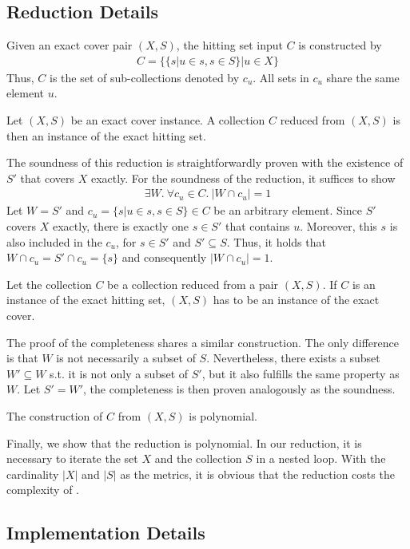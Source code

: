 \subsection{Reduction Details}
Given an exact cover pair $(X, S)$, the hitting set input $C$ is constructed by 
\begin{align*}
    C = \{\{s | u \in s, s \in S \} | u \in X\}
\end{align*}
Thus, $C$ is the set of sub-collections denoted by $c_u$. All sets in $c_u$ share the same element $u$.
\begin{lemma}[Soundess]
    Let $(X, S)$ be an exact cover instance. A collection $C$ reduced from $(X, S)$ is then an instance of the exact hitting set.
\end{lemma}
The soundness of this reduction is straightforwardly proven with the existence of $S'$ that covers $X$ exactly.
For the soundness of the reduction, it suffices to show 
\begin{align*}
    \exists W.\ \forall c_u \in C.\ |W \cap c_u| = 1
\end{align*}
Let $W = S'$ and $c_u = \{s | u \in s, s \in S \} \in C$ be an arbitrary element. 
Since $S'$ covers $X$ exactly, there is exactly one $s \in S'$ that contains $u$. Moreover, this $s$
is also included in the $c_u$, for $s \in S'$ and $S' \subseteq S$. Thus, it holds that $W \cap c_u = S' \cap c_u = \{s\}$ and consequently $|W \cap c_u| = 1$.
\begin{lemma}[Completeness]
    Let the collection $C$ be a collection reduced from a pair $(X, S)$. If $C$ is an instance of the exact hitting set, 
    $(X, S)$ has to be an instance of the exact cover.
\end{lemma}
The proof of the completeness shares a similar construction. The only difference is that $W$ is not 
necessarily a subset of $S$. Nevertheless, there exists a subset $W' \subseteq W$ s.t. it is not only a subset of $S'$, but it
also fulfills the same property as $W$. Let $S' = W'$, the completeness is then proven analogously as the soundness. 
\begin{lemma}
    The construction of $C$ from $(X, S)$ is polynomial. 
\end{lemma}
Finally, we show that the reduction is polynomial. In our reduction, it is necessary to iterate the set $X$ and the collection $S$ in a nested loop. 
With the cardinality $|X|$ and $|S|$ as the metrics, it is obvious that the reduction costs the complexity of .

\subsection{Implementation Details}
